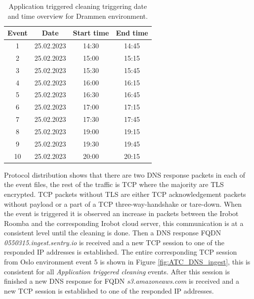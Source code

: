 \begin{table}[H]
\centering
\caption{Application triggered cleaning triggering date and time overview for Drammen environment.}
\label{tab:ATC_dateandtimeDrammen}
\begin{tabular}{|c|c|c|c|}
\hline
\textbf{Event} & \textbf{Date} & \textbf{Start time} & \textbf{End time} \\ \hline
1              & 25.02.2023         & 14:30               & 14:45             \\ \hline
2              & 25.02.2023         & 15:00               & 15:15             \\ \hline
3              & 25.02.2023         & 15:30               & 15:45             \\ \hline
4              & 25.02.2023         & 16:00               & 16:15             \\ \hline
5              & 25.02.2023         & 16:30               & 16:45             \\ \hline
6              & 25.02.2023         & 17:00               & 17:15             \\ \hline
7              & 25.02.2023         & 17:30               & 17:45             \\ \hline
8              & 25.02.2023         & 19:00               & 19:15             \\ \hline
9              & 25.02.2023         & 19:30               & 19:45             \\ \hline
10             & 25.02.2023         & 20:00               & 20:15             \\ \hline
\end{tabular}
\end{table}

Protocol distribution shows that there are two DNS response packets in each of the event files, the rest of the traffic is TCP where the majority are TLS encrypted. TCP packets without TLS are either TCP acknowledgement packets without payload or a part of a TCP three-way-handshake or tare-down. When the event is triggered it is observed an increase in packets between the Irobot Roomba and the corresponding Irobot cloud server, this communication is at a consistent level until the cleaning is done. Then a DNS response FQDN \textit{0550315.ingest.sentry.io} is received and a new TCP session to one of the responded IP addresses is established. The entire corresponding TCP session from Oslo environment event 5 is shown in Figure \ref{fig:ATC_DNS_ingest}, this is consistent for all \textit{Application triggered cleaning} events. After this session is finished a new DNS response for FQDN \textit{s3.amazoneaws.com} is received and a new TCP session is established to one of the responded IP addresses. 

